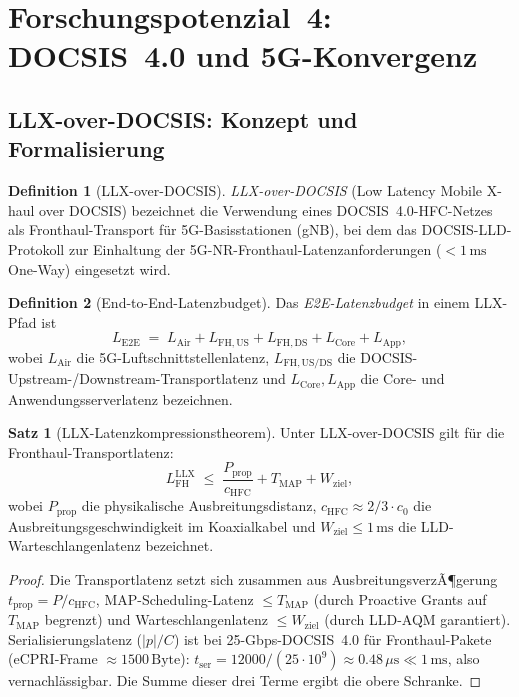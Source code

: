 ﻿\documentclass[a4paper,12pt]{article}
\theoremstyle{definition}
\newtheorem{definition}{Definition}
\newtheorem{satz}{Satz}
\begin{document}
\section{Forschungspotenzial~4: DOCSIS~4.0 und 5G-Konvergenz}

\subsection{LLX-over-DOCSIS: Konzept und Formalisierung}

\begin{definition}[LLX-over-DOCSIS]
    \emph{LLX-over-DOCSIS} (Low Latency Mobile X-haul over DOCSIS) bezeichnet
    die Verwendung eines DOCSIS~4.0-HFC-Netzes als Fronthaul-Transport f\"{u}r
    5G-Basisstationen (gNB), bei dem das DOCSIS-LLD-Protokoll zur Einhaltung
    der 5G-NR-Fronthaul-Latenzanforderungen ($< 1\,\mathrm{ms}$ One-Way) eingesetzt
    wird.
\end{definition}

\begin{definition}[End-to-End-Latenzbudget]
    Das \emph{E2E-Latenzbudget} in einem LLX-Pfad ist
    \[
        L_{\mathrm{E2E}} \;=\; L_{\mathrm{Air}} + L_{\mathrm{FH,US}} + L_{\mathrm{FH,DS}} + L_{\mathrm{Core}} + L_{\mathrm{App}},
    \]
    wobei $L_{\mathrm{Air}}$ die 5G-Luftschnittstellenlatenz, $L_{\mathrm{FH,US/DS}}$
    die DOCSIS-Upstream-/Downstream-Transportlatenz und $L_{\mathrm{Core}}, L_{\mathrm{App}}$
    die Core- und Anwendungsserverlatenz bezeichnen.
\end{definition}

\begin{satz}[LLX-Latenzkompressionstheorem]
    \label{satz:llx}
    Unter LLX-over-DOCSIS gilt f\"{u}r die Fronthaul-Transportlatenz:
    \[
        L_{\mathrm{FH}}^{\mathrm{LLX}} \;\leq\; \frac{P_{\mathrm{prop}}}{c_{\mathrm{HFC}}} + T_{\mathrm{MAP}} + W_{\mathrm{ziel}},
    \]
    wobei $P_{\mathrm{prop}}$ die physikalische Ausbreitungsdistanz,
    $c_{\mathrm{HFC}} \approx 2/3 \cdot c_0$ die Ausbreitungsgeschwindigkeit im
    Koaxialkabel und $W_{\mathrm{ziel}} \leq 1\,\mathrm{ms}$ die LLD-Warteschlangenlatenz
    bezeichnet.
\end{satz}

\begin{proof}
    Die Transportlatenz setzt sich zusammen aus AusbreitungsverzÃ¶gerung
    $t_{\mathrm{prop}} = P/c_{\mathrm{HFC}}$, MAP-Scheduling-Latenz $\leq T_{\mathrm{MAP}}$
    (durch Proactive Grants auf $T_{\mathrm{MAP}}$ begrenzt) und
    Warteschlangenlatenz $\leq W_{\mathrm{ziel}}$ (durch LLD-AQM garantiert).
    Serialisierungslatenz ($|p|/C$) ist bei 25-Gbps-DOCSIS~4.0 f\"{u}r
    Fronthaul-Pakete (eCPRI-Frame $\approx 1500\,\mathrm{Byte}$):
    $t_{\mathrm{ser}} = 12000/(25 \cdot 10^9) \approx 0.48\,\mu\mathrm{s} \ll 1\,\mathrm{ms}$,
    also vernachl\"{a}ssigbar. Die Summe dieser drei Terme ergibt die obere Schranke.
\end{proof}
\end{document}
